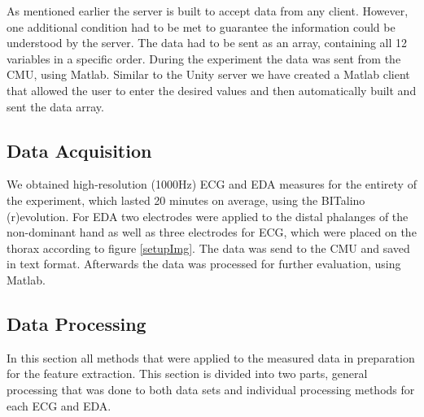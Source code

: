 As mentioned earlier the server is built to accept data from any client. However, one additional condition had to be met to guarantee the information could be understood by the server. The data had to be sent as an array, containing all 12 variables in a specific order. During the experiment the data was sent from the CMU, using Matlab. Similar to the Unity server we have created a Matlab client that allowed the user to enter the desired values and then automatically built and sent the data array.

%

\subsection{Data Acquisition}
We obtained high-resolution (1000Hz) ECG and EDA measures for the entirety of the experiment, which lasted 20 minutes on average, using the BITalino (r)evolution. For EDA two electrodes were applied to the distal phalanges of the non-dominant hand as well as three electrodes for ECG, which were placed on the thorax according to figure \ref{setupImg}. The data was send to the CMU and saved in text format. Afterwards the data was processed for further evaluation, using Matlab.

\subsection{Data Processing}
In this section all methods that were applied to the measured data in preparation for the feature extraction. This section is divided into two parts, general processing that was done to both data sets and individual processing methods for each ECG and EDA.

